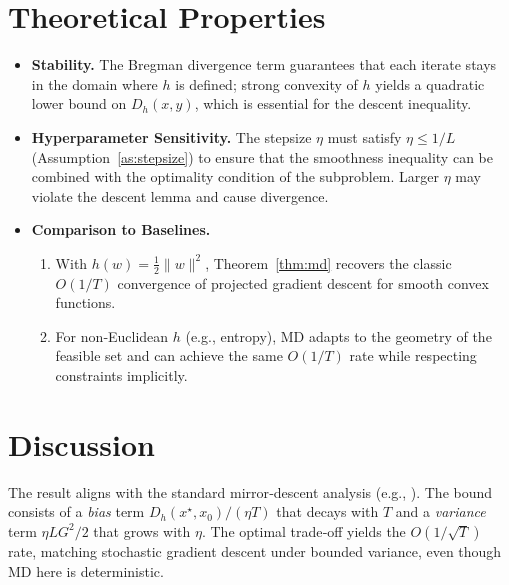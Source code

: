 \documentclass[11pt]{article}
\newcommand{\Breg}[2]{D_{h}(#1,#2)}
\begin{document}
\section*{Theoretical Properties}
\begin{itemize}
\item \textbf{Stability.} The Bregman divergence term guarantees that each iterate stays in the domain where $h$ is defined; strong convexity of $h$ yields a quadratic lower bound on $\Breg{x}{y}$, which is essential for the descent inequality.
\item \textbf{Hyperparameter Sensitivity.} The stepsize $\eta$ must satisfy $\eta\le 1/L$ (Assumption~\ref{as:stepsize}) to ensure that the smoothness inequality can be combined with the optimality condition of the subproblem. Larger $\eta$ may violate the descent lemma and cause divergence.
\item \textbf{Comparison to Baselines.}
   \begin{enumerate}
   \item With $h(w)=\tfrac12\|w\|^{2}$, Theorem~\ref{thm:md} recovers the classic $O(1/T)$ convergence of projected gradient descent for smooth convex functions.
   \item For non‑Euclidean $h$ (e.g., entropy), MD adapts to the geometry of the feasible set and can achieve the same $O(1/T)$ rate while respecting constraints implicitly.
   \end{enumerate}
\end{itemize}

\section*{Discussion}
The result aligns with the standard mirror‑descent analysis (e.g., \cite{Beck2003}). The bound consists of a \emph{bias} term $\Breg{x^{\star}}{x_0}/(\eta T)$ that decays with $T$ and a \emph{variance} term $\eta L G^{2}/2$ that grows with $\eta$. The optimal trade‑off yields the $O(1/\sqrt{T})$ rate, matching stochastic gradient descent under bounded variance, even though MD here is deterministic.

\newpage
\end{document}
